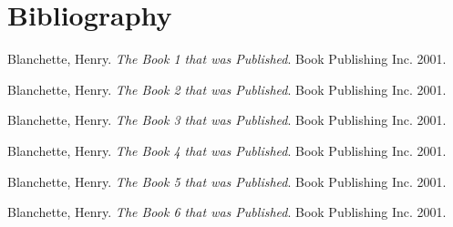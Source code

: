 \documentclass{article}
\begin{document}
\section*{Bibliography}

\noindent  Blanchette, Henry. \textit{The Book 1 that was Published}. Book Publishing Inc. 2001. 



\noindent  Blanchette, Henry. \textit{The Book 2 that was Published}. Book Publishing Inc. 2001. 



\noindent  Blanchette, Henry. \textit{The Book 3 that was Published}. Book Publishing Inc. 2001. 



\noindent  Blanchette, Henry. \textit{The Book 4 that was Published}. Book Publishing Inc. 2001. 



\noindent  Blanchette, Henry. \textit{The Book 5 that was Published}. Book Publishing Inc. 2001. 



\noindent  Blanchette, Henry. \textit{The Book 6 that was Published}. Book Publishing Inc. 2001. 
\end{document}
